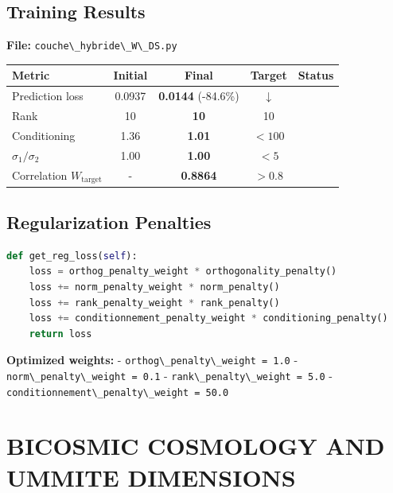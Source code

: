 \documentclass[11pt]{article}
\providecommand{\cmark}{\ding{51}}
\newcommand{\symSucces}{\textcolor{success}{\cmark}}
\newcommand{\passthrough}[1]{#1}
\begin{document}
\hypertarget{training-results}{%
\subsection{Training Results}\label{training-results}}

\textbf{File:} \passthrough{\lstinline!couche\_hybride\_W\_DS.py!}

\begin{longtable}{@{}lcccc@{}}
\toprule
\textbf{Metric} & \textbf{Initial} & \textbf{Final} & \textbf{Target} & \textbf{Status} \\
\midrule
Prediction loss & 0.0937 & \textbf{0.0144} (-84.6\%) & $\downarrow$ & \symSucces \\
Rank & 10 & \textbf{10} & 10 & \symSucces \\
Conditioning & 1.36 & \textbf{1.01} & $< 100$ & \symSucces \\
$\sigma_1/\sigma_2$ & 1.00 & \textbf{1.00} & $< 5$ & \symSucces \\
Correlation $W_{\text{target}}$ & - & \textbf{0.8864} & $> 0.8$ & \symSucces \\
\bottomrule
\end{longtable}

\hypertarget{regularization-penalties}{%
\subsection{Regularization Penalties}\label{regularization-penalties}}

\begin{lstlisting}[language=Python]
def get_reg_loss(self):
    loss = orthog_penalty_weight * orthogonality_penalty()
    loss += norm_penalty_weight * norm_penalty()
    loss += rank_penalty_weight * rank_penalty()
    loss += conditionnement_penalty_weight * conditioning_penalty()
    return loss
\end{lstlisting}

\textbf{Optimized weights:} -
\passthrough{\lstinline!orthog\_penalty\_weight = 1.0!} -
\passthrough{\lstinline!norm\_penalty\_weight = 0.1!} -
\passthrough{\lstinline!rank\_penalty\_weight = 5.0!} -
\passthrough{\lstinline!conditionnement\_penalty\_weight = 50.0!}

\hypertarget{bicosmic-cosmology-and-ummite-dimensions}{%
\section{BICOSMIC COSMOLOGY AND UMMITE
DIMENSIONS}\label{bicosmic-cosmology-and-ummite-dimensions}}
\end{document}
